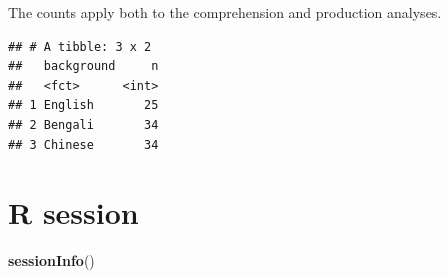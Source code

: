 \documentclass[]{article}
\newenvironment{Shaded}{\begin{snugshade}}{\end{snugshade}}
\newcommand{\DataTypeTok}[1]{\textcolor[rgb]{0.13,0.29,0.53}{#1}}
\newcommand{\KeywordTok}[1]{\textcolor[rgb]{0.13,0.29,0.53}{\textbf{#1}}}
\newcommand{\NormalTok}[1]{#1}
\newcommand{\OperatorTok}[1]{\textcolor[rgb]{0.81,0.36,0.00}{\textbf{#1}}}
\newcommand{\StringTok}[1]{\textcolor[rgb]{0.31,0.60,0.02}{#1}}
\begin{document}
The counts apply both to the comprehension and production analyses.

\begin{Shaded}
\end{Shaded}

\begin{verbatim}
## # A tibble: 3 x 2
##   background     n
##   <fct>      <int>
## 1 English       25
## 2 Bengali       34
## 3 Chinese       34
\end{verbatim}

\hypertarget{r-session}{%
\section{R session}\label{r-session}}

\begin{Shaded}
\begin{Highlighting}[]
\KeywordTok{sessionInfo}\NormalTok{()}
\end{Highlighting}
\end{Shaded}
\end{document}
